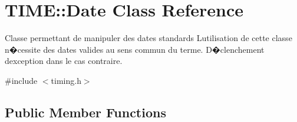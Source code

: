 \hypertarget{class_t_i_m_e_1_1_date}{}\section{T\+I\+M\+E\+:\+:Date Class Reference}
\label{class_t_i_m_e_1_1_date}


Classe permettant de manipuler des dates standards L\textquotesingle{}utilisation de cette classe n�cessite des dates valides au sens commun du terme. D�clenchement d\textquotesingle{}exception dans le cas contraire.  




{\ttfamily \#include $<$timing.\+h$>$}

\subsection*{Public Member Functions}
